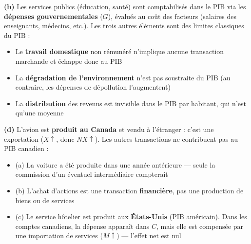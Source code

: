 \begin{reponse}
\textbf{(b)} Les services publics (éducation, santé) sont comptabilisés dans le PIB via les \textbf{dépenses gouvernementales} ($G$), évalués au coût des facteurs (salaires des enseignants, médecins, etc.). Les trois autres éléments sont des limites classiques du PIB :
\begin{itemize}
   \item Le \textbf{travail domestique} non rémunéré n'implique aucune transaction marchande et échappe donc au PIB
   \item La \textbf{dégradation de l'environnement} n'est pas soustraite du PIB (au contraire, les dépenses de dépollution l'augmentent)
   \item La \textbf{distribution} des revenus est invisible dans le PIB par habitant, qui n'est qu'une moyenne
\end{itemize}
\end{reponse}


\begin{reponse}
\textbf{(d)} L'avion est \textbf{produit au Canada} et vendu à l'étranger : c'est une exportation ($X\uparrow$, donc $NX\uparrow$). Les autres transactions ne contribuent pas au PIB canadien :
\begin{itemize}
   \item (a) La voiture a été produite dans une année antérieure --- seule la commission d'un éventuel intermédiaire compterait
   \item (b) L'achat d'actions est une transaction \textbf{financière}, pas une production de biens ou de services
   \item (c) Le service hôtelier est produit aux \textbf{États-Unis} (PIB américain). Dans les comptes canadiens, la dépense apparaît dans $C$, mais elle est compensée par une importation de services ($M\uparrow$) --- l'effet net est nul
\end{itemize}
\end{reponse}

